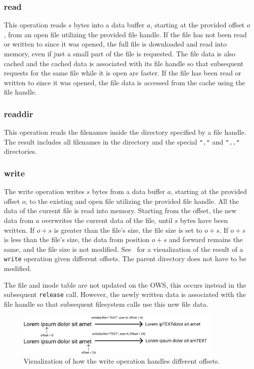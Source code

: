 \subsubsection{read}
This operation reads $s$ bytes into a data buffer $a$, starting at the provided offset $o$, from an open file utilizing the provided file handle. If the file has not been read or written to since it was opened, the full file is downloaded and read into memory, even if just a small part of the file is requested. The file data is also cached and the cached data is associated with its file handle so that subsequent requests for the same file while it is open are faster. If the file has been read or written to since it was opened, the file data is accessed from the cache using the file handle.

\subsubsection{readdir}
This operation reads the filenames inside the directory specified by a file handle. The result includes all filenames in the directory and the special \texttt{"."} and \texttt{".."} directories.

\subsubsection{write}
The write operation writes $s$ bytes from a data buffer $a$, starting at the provided offset $o$, to the existing and open file utilizing the provided file handle. All the data of the current file is read into memory. Starting from the offset, the new data from $a$ overwrites the current data of the file, until $s$ bytes have been written. If $o + s$ is greater than the file's size, the file size is set to $o + s$. If $o + s$ is less than the file's size, the data from position $o + s$ and forward remains the same, and the file size is not modified. See~ for a visualization of the result of a \texttt{write} operation given different offsets. The parent directory does not have to be modified. 

The file and inode table are not updated on the \gls{OWS}, this occurs instead in the subsequent \texttt{release} call. However, the newly written data is associated with the file handle so that subsequent filesystem calls use this new file data.

\begin{figure}[!ht]
	\begin{center}
	  \includegraphics[width=0.9\textwidth]{figures.nosync/write_flow.png}
	\end{center}
	\caption{Visualization of how the write operation handles different offsets.}
	\label{fig:write_flow}
\end{figure}
\FloatBarrier

